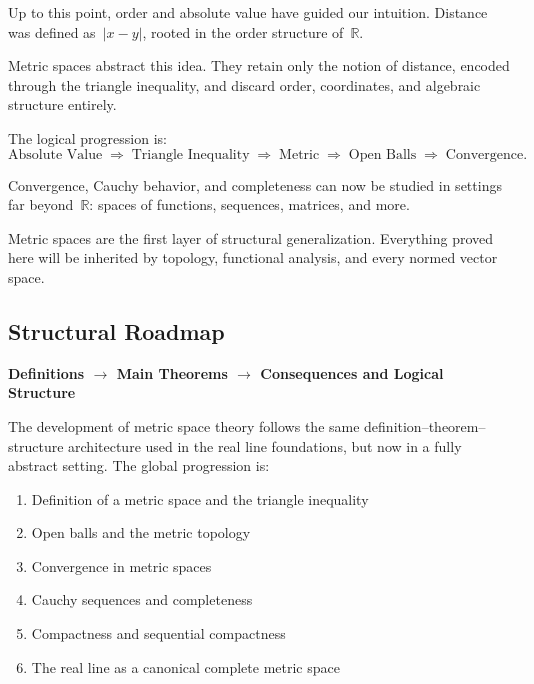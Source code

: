\begin{tcolorbox}[
  colback=gray!6,
  colframe=gray!40,
  arc=2pt,
  left=8pt, right=8pt, top=6pt, bottom=6pt,
  title={\small\textbf{Structural Role: Distance — Abstraction of Proximity}},
  fonttitle=\small\bfseries
]
Up to this point, order and absolute value have guided our intuition.
Distance was defined as~$|x - y|$, rooted in the order structure of~$\mathbb{R}$.

Metric spaces abstract this idea.
They retain only the notion of distance,
encoded through the triangle inequality,
and discard order, coordinates, and algebraic structure entirely.

The logical progression is:
\[
  \text{Absolute Value}
  \;\Rightarrow\;
  \text{Triangle Inequality}
  \;\Rightarrow\;
  \text{Metric}
  \;\Rightarrow\;
  \text{Open Balls}
  \;\Rightarrow\;
  \text{Convergence}.
\]

Convergence, Cauchy behavior, and completeness
can now be studied in settings far beyond~$\mathbb{R}$:
spaces of functions, sequences, matrices, and more.

Metric spaces are the first layer of structural generalization.
Everything proved here will be inherited by topology,
functional analysis, and every normed vector space.
\end{tcolorbox}
\vspace{1em}

\subsection*{Structural Roadmap}

\begin{center}
\textbf{Definitions $\longrightarrow$ Main Theorems
$\longrightarrow$ Consequences and Logical Structure}
\end{center}

The development of metric space theory follows the same
definition--theorem--structure architecture used in the real line
foundations, but now in a fully abstract setting.
The global progression is:

\begin{enumerate}
  \item Definition of a metric space and the triangle inequality
  \item Open balls and the metric topology
  \item Convergence in metric spaces
  \item Cauchy sequences and completeness
  \item Compactness and sequential compactness
  \item The real line as a canonical complete metric space
\end{enumerate}


